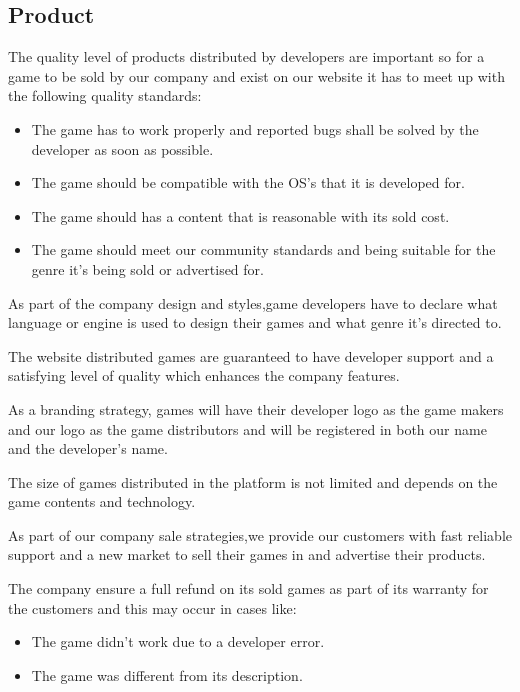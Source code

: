 \documentclass[fontsize=14pt,svgnames]{scrreprt}
\begin{document}
\subsection{Product}
\par The quality level of products distributed by developers are important so for a game to be sold by our company and exist on our website it has to meet up with the following quality standards:
\begin{itemize}
\item The game has to work properly and reported bugs shall be solved by the developer as soon as possible. 
\item The game should be compatible with the OS's that it is developed for.
\item The game should has a content that is reasonable with its sold cost.
\item The game should meet our community standards and being suitable for the genre it's being sold or advertised for.
\end{itemize}
\par  As part of the company design and styles,game developers have to declare what language or engine is used to design their games and what  genre it's directed to.
\par The website distributed games are guaranteed to have developer support and a satisfying level of quality which enhances the company features.
\par As a branding strategy, games will have their developer logo as the game makers and our logo as the game distributors and will be registered in both our name and the developer's name.
\par The size of games distributed in the platform is not limited and depends on the game contents and technology.
\par As part of our company sale strategies,we provide our customers with fast reliable support and a new market to sell their games in and advertise their products. 
\par The company ensure a full refund on its sold games as part of its warranty for the customers and this may occur in cases like:
\begin{itemize}
\item The game didn't work due to a developer error.
\item The game was different from its description.
\end{itemize}
\end{document}
